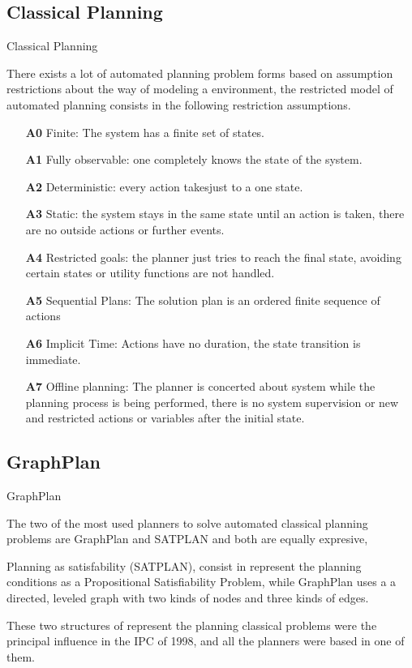 \documentclass[handout,t]{beamer}
\begin{document}
\subsection{Classical Planning}
\begin{frame}{Classical Planning}
  
  There exists a lot of automated planning problem forms based on assumption
restrictions about the way of modeling a environment, the
restricted model of automated planning consists in the
following restriction assumptions.

\end{frame}

\begin{frame}
\begin{itemize}
\item[\textbf{A0}] Finite: The system has a finite set of states.
\item[\textbf{A1}] Fully observable: one completely knows the state of the system.
\item[\textbf{A2}] Deterministic: every action takesjust to a one state.
\item[\textbf{A3}] Static: the system stays in the
  same state until an action is taken, there are no outside actions or
  further events.
\item[\textbf{A4}] Restricted goals: the planner just tries to reach
  the final state, avoiding certain states or utility functions are
  not handled.
\item[\textbf{A5}] Sequential Plans: The solution plan is an ordered
  finite sequence of actions
\item[\textbf{A6}] Implicit Time: Actions have no duration, the state
  transition is immediate.
\item[\textbf{A7}] Offline planning: The planner is concerted about
  system while the planning process is being performed, there
  is no system supervision or new and restricted actions or variables
  after the initial state.
\end{itemize}
  

\end{frame}
\subsection{GraphPlan}
\begin{frame}{GraphPlan}
  
The two of the most used planners to solve automated classical planning
problems are GraphPlan  and SATPLAN and both are equally expresive,

Planning as satisfability (SATPLAN), consist in represent the planning
conditions as a Propositional Satisfiability Problem, while GraphPlan
uses a a directed, leveled graph with two kinds of nodes and three
kinds of edges.

These two structures of represent the planning classical problems were
the principal influence in the IPC of 1998, and all the planners were
based in one of them.

\end{frame}
\end{document}

